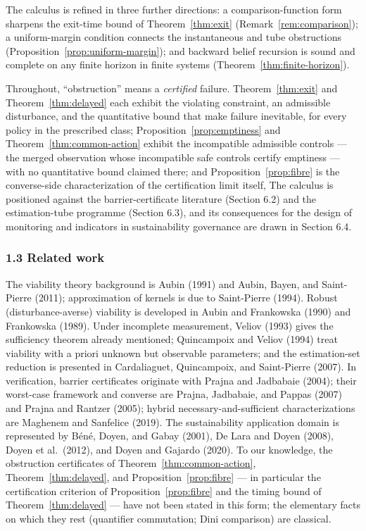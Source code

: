\documentclass[11pt]{article}
\theoremstyle{definition}
\begin{document}
The calculus is refined in three further directions: a
comparison-function form sharpens the exit-time bound of
Theorem~\ref{thm:exit} (Remark~\ref{rem:comparison}); a uniform-margin
condition connects the instantaneous and tube obstructions
(Proposition~\ref{prop:uniform-margin}); and backward belief recursion is
sound and complete on any finite horizon in finite systems
(Theorem~\ref{thm:finite-horizon}).

Throughout, ``obstruction'' means a \emph{certified} failure. Theorem~\ref{thm:exit} and Theorem~\ref{thm:delayed} each exhibit the violating constraint, an admissible disturbance,
and the quantitative bound that make failure inevitable, for every policy in the prescribed class; Proposition~\ref{prop:emptiness} and Theorem~\ref{thm:common-action} exhibit the incompatible
admissible controls --- the merged observation whose incompatible safe
controls certify emptiness --- with no quantitative bound claimed there;
and Proposition~\ref{prop:fibre} is the converse-side characterization of the certification
limit itself,  The calculus is positioned against
the barrier-certificate literature (Section 6.2) and the estimation-tube
programme (Section 6.3), and its consequences for the design of
monitoring and indicators in sustainability governance are drawn in
Section 6.4.

\subsubsection{1.3 Related work}\label{related-work}

The viability theory background is Aubin (1991) and Aubin, Bayen, and
Saint-Pierre (2011); approximation of kernels is due to Saint-Pierre
(1994). Robust (disturbance-averse) viability is developed in Aubin and
Frankowska (1990) and Frankowska (1989). Under incomplete measurement,
Veliov (1993) gives the sufficiency theorem already mentioned;
Quincampoix and Veliov (1994) treat viability with a priori unknown but
observable parameters; and the estimation-set reduction is presented in
Cardaliaguet, Quincampoix, and Saint-Pierre (2007). In verification,
barrier certificates originate with Prajna and Jadbabaie (2004); their
worst-case framework and converse are Prajna, Jadbabaie, and Pappas
(2007) and Prajna and Rantzer (2005); hybrid necessary-and-sufficient
characterizations are Maghenem and Sanfelice (2019). The sustainability
application domain is represented by B\'en\'e, Doyen, and Gabay (2001), De
Lara and Doyen (2008), Doyen et al.~(2012), and Doyen and Gajardo
(2020). To our knowledge, the obstruction certificates of Theorem~\ref{thm:common-action}, Theorem~\ref{thm:delayed}, and Proposition~\ref{prop:fibre}
--- in particular the certification criterion of Proposition~\ref{prop:fibre} and the
timing bound of Theorem~\ref{thm:delayed} --- have not been stated in this form; the elementary facts on which they rest (quantifier commutation; Dini comparison) are classical.
\end{document}
